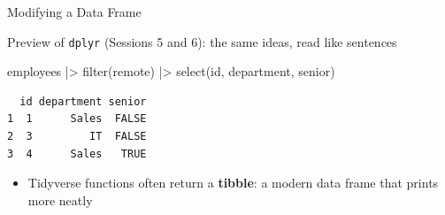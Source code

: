 \documentclass[
  ignorenonframetext,
  aspectratio=169,
]{beamer}
\newenvironment{Shaded}{\begin{snugshade}}{\end{snugshade}}
\newcommand{\CommentTok}[1]{\textcolor[rgb]{0.37,0.37,0.37}{#1}}
\newcommand{\DecValTok}[1]{\textcolor[rgb]{0.68,0.00,0.00}{#1}}
\newcommand{\FunctionTok}[1]{\textcolor[rgb]{0.28,0.35,0.67}{#1}}
\newcommand{\NormalTok}[1]{\textcolor[rgb]{0.00,0.23,0.31}{#1}}
\newcommand{\OtherTok}[1]{\textcolor[rgb]{0.00,0.23,0.31}{#1}}
\newcommand{\SpecialCharTok}[1]{\textcolor[rgb]{0.37,0.37,0.37}{#1}}
\providecommand{\tightlist}{%
  \setlength{\itemsep}{0pt}\setlength{\parskip}{0pt}}\usepackage{longtable,booktabs,array}
\begin{document}
\begin{frame}[fragile]{Modifying a Data Frame}
\protect\hypertarget{modifying-a-data-frame}{}
\begin{Shaded}
\end{Shaded}

Preview of \texttt{dplyr} (Sessions 5 and 6): the same ideas, read like
sentences

\begin{Shaded}
\begin{Highlighting}[]
\NormalTok{employees }\SpecialCharTok{|\textgreater{}}
  \FunctionTok{filter}\NormalTok{(remote) }\SpecialCharTok{|\textgreater{}}
  \FunctionTok{select}\NormalTok{(id, department, senior)}
\end{Highlighting}
\end{Shaded}

\begingroup\tiny\color{darkgray}

\begin{verbatim}
  id department senior
1  1      Sales  FALSE
2  3         IT  FALSE
3  4      Sales   TRUE
\end{verbatim}

\endgroup

\begin{itemize}
\tightlist
\item
  Tidyverse functions often return a \textbf{tibble}: a modern data
  frame that prints more neatly
\end{itemize}
\end{frame}
\end{document}
